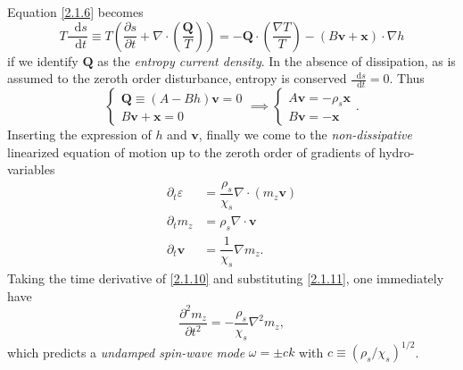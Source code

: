 \documentclass[10pt,nofootinbib]{revtex4}
\newcommand*\dd{\mathop{}\!\mathrm{d}}
\begin{document}
			Equation \eqref{2.1.6} becomes
			\begin{equation}\label{2.1.7}
				T\dfrac{\dd s}{\dd t}\equiv T \left(\dfrac{\partial s}{\partial t}+\nabla\cdot \left(\dfrac{\bm{Q}}{T}\right) \right)=-\bm{Q}\cdot \left(\dfrac{\nabla T}{T}\right)-(B\bm{v}+\bm{x})\cdot\nabla h
			\end{equation}
			if we identify $\bm{Q}$ as the \emph{entropy current density}. In the absence of dissipation, as is assumed to the zeroth order disturbance, entropy is conserved $\frac{\dd s}{\dd t}=0$. Thus
			\begin{equation}\label{2.1.8}
				\begin{cases}
					\bm{Q}\equiv (A-Bh)\bm{v}=0\\
					B\bm{v}+\bm{x}=0
				\end{cases}\implies
				\begin{cases}
					A\bm{v}=-\rho_s\bm{x}\\
					B\bm{v}=-\bm{x}
				\end{cases}.
			\end{equation}
			Inserting the expression of $h$ and $\bm{v}$, finally we come to the \emph{non-dissipative} linearized equation of motion up to the zeroth order of gradients of hydro-variables
			\begin{align}
				\partial_t\varepsilon&=\dfrac{\rho_s}{\chi_s}\nabla\cdot(m_z\bm{v})\label{2.1.9}\\
				\partial_t m_z&=\rho_s\nabla\cdot\bm{v}\label{2.1.10}\\
				\partial_t \bm{v}&=\dfrac{1}{\chi_s}\nabla m_z\label{2.1.11}.
			\end{align}
			Taking the time derivative of \eqref{2.1.10} and substituting \eqref{2.1.11}, one immediately have
			\begin{equation}\label{2.1.12}
				\dfrac{\partial^2 m_z}{\partial t^2}=-\dfrac{\rho_s}{\chi_s}\nabla^2m_z,
			\end{equation}
			which predicts a \emph{undamped spin-wave mode} $\omega=\pm ck$ with $c\equiv(\rho_s/\chi_s)^{1/2}$.
\end{document}
